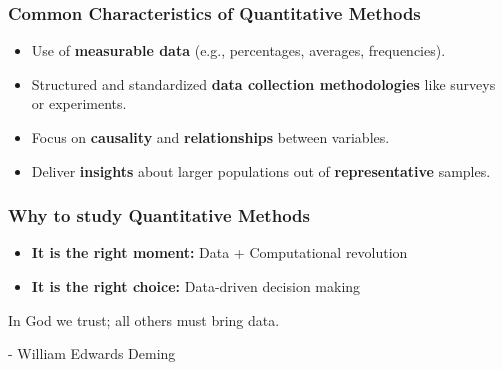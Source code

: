 \documentclass[aspectratio=169]{beamer}
\begin{document}
\begin{frame}
    \frametitle{Common Characteristics of Quantitative Methods}
    \begin{itemize}
        \item Use of \textbf{measurable data} (e.g., percentages, averages, frequencies). \medskip
        \item Structured and standardized \textbf{data collection methodologies} like surveys or experiments. \medskip
        \item Focus on \textbf{causality} and \textbf{relationships} between variables. \medskip
        \item Deliver \textbf{insights} about larger populations out of \textbf{representative} samples.
    \end{itemize}
\end{frame}

\begin{frame}
\frametitle{Why to study Quantitative Methods}

    \begin{itemize}
        \item \textbf{It is the right moment:} Data + Computational revolution  \medskip
        \item \textbf{It is the right choice:} Data-driven decision making
    \end{itemize}
    \vspace{1cm}
    
    \begin{center}
        \begin{tcolorbox}[enhanced,sharp corners,
            width=8.5cm,
            colback=white,
            overlay={
                \node[anchor=north west,fill=white,draw=white,circle,inner sep=1pt] 
                at ([xshift=-0.17cm,yshift=0.2cm]frame.north west) {\faQuoteLeft};
                \node[anchor=south east,fill=white,draw=white,circle,inner sep=1pt] 
                at ([xshift=0.17cm,yshift=-0.2cm]frame.south east) {\faQuoteRight};
            }
            ]
            In God we trust; all others must bring data. \\
            \vspace{0cm}

            {\small - William Edwards Deming}
        \end{tcolorbox}
    \end{center}

\end{frame}


\end{document}
